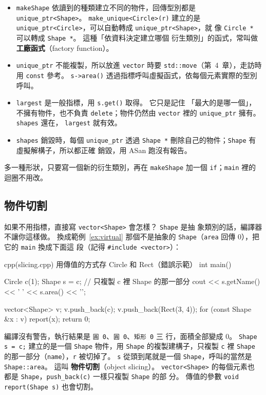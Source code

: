 \begin{itemize}
\item \texttt{makeShape} 依讀到的種類建立不同的物件，回傳型別都是
\texttt{unique\_ptr<Shape>}。 \texttt{make\_unique<Circle>(r)} 建立的是
\texttt{unique\_ptr<Circle>}，可以自動轉成 \texttt{unique\_ptr<Shape>}，就
像 \texttt{Circle *} 可以轉成 \texttt{Shape *}。 這種「依資料決定建立哪個
衍生類別」的函式，常叫做\textbf{工廠函式}（factory function）。
\item \texttt{unique\_ptr} 不能複製，所以放進 \texttt{vector} 時要
\texttt{std::move}（第~4~章），走訪時用 \texttt{const} 參考。
\texttt{s->area()} 透過指標呼叫虛擬函式，依每個元素實際的型別呼叫。
\item \texttt{largest} 是一般指標，用 \texttt{s.get()} 取得。 它只是記住
「最大的是哪一個」，不擁有物件，也不負責 \texttt{delete}；物件仍然由
\texttt{vector} 裡的 \texttt{unique\_ptr} 擁有。 \texttt{shapes} 還在，
\texttt{largest} 就有效。
\item \texttt{shapes} 銷毀時，每個 \texttt{unique\_ptr} 透過
\texttt{Shape *} 刪除自己的物件；\texttt{Shape} 有虛擬解構子，所以都正確
銷毀，用 ASan 跑沒有報告。
\end{itemize}

多一種形狀，只要寫一個新的衍生類別，再在 \texttt{makeShape} 加一個
\texttt{if}；\texttt{main} 裡的迴圈不用改。

\subsection{物件切割}

如果不用指標，直接寫 \texttt{vector<Shape>} 會怎樣？ \texttt{Shape} 是抽
象類別的話，編譯器不讓你這樣做。 換成範例~\ref{ex:virtual} 那個不是抽象的
\texttt{Shape}（\texttt{area} 回傳 $0$），把它的 \texttt{main} 換成下面這
段（記得 \texttt{\#include <vector>}）：

\begin{code}{cpp}{(slicing.cpp) 用傳值的方式存 Circle 和 Rect（錯誤示範）}
int main() {
    Circle c(1);
    Shape s = c;               // 只複製 c 裡 Shape 的那一部分
    cout << s.getName() << ' ' << s.area() << '\n';

    vector<Shape> v;
    v.push_back(c);
    v.push_back(Rect(3, 4));
    for (const Shape &x : v) {
        report(x);
    }
    return 0;
}
\end{code}

編譯沒有警告，執行結果是 \texttt{圓 0}、\texttt{圓 0}、\texttt{矩形 0} 三
行，面積全部變成 $0$。 \texttt{Shape s = c;} 建立的是一個
\texttt{Shape} 物件，用 \texttt{Shape} 的複製建構子，只複製 \texttt{c} 裡
\texttt{Shape} 的那一部分（\texttt{name}），\texttt{r} 被切掉了。 \texttt{s}
從頭到尾就是一個 \texttt{Shape}，呼叫的當然是 \texttt{Shape::area}。 這叫
\textbf{物件切割}（object slicing）。 \texttt{vector<Shape>} 的每個元素也
都是 \texttt{Shape}，\texttt{push\_back(c)} 一樣只複製 \texttt{Shape} 的部
分。 傳值的參數 \texttt{void report(Shape s)} 也會切割。

